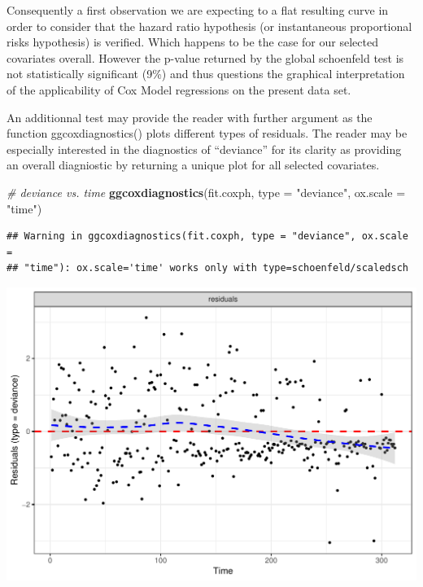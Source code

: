 \documentclass[]{article}
\newenvironment{Shaded}{\begin{snugshade}}{\end{snugshade}}
\newcommand{\KeywordTok}[1]{\textcolor[rgb]{0.13,0.29,0.53}{\textbf{#1}}}
\newcommand{\DataTypeTok}[1]{\textcolor[rgb]{0.13,0.29,0.53}{#1}}
\newcommand{\StringTok}[1]{\textcolor[rgb]{0.31,0.60,0.02}{#1}}
\newcommand{\CommentTok}[1]{\textcolor[rgb]{0.56,0.35,0.01}{\textit{#1}}}
\newcommand{\NormalTok}[1]{#1}
\begin{document}
Consequently a first observation we are expecting to a flat resulting
curve in order to consider that the hazard ratio hypothesis (or
instantaneous proportional risks hypothesis) is verified. Which happens
to be the case for our selected covariates overall. However the p-value
returned by the global schoenfeld test is not statistically significant
(9\%) and thus questions the graphical interpretation of the
applicability of Cox Model regressions on the present data set.

An additionnal test may provide the reader with further argument as the
function ggcoxdiagnostics() plots different types of residuals. The
reader may be especially interested in the diagnostics of ``deviance''
for its clarity as providing an overall diagniostic by returning a
unique plot for all selected covariates.

\begin{Shaded}
\begin{Highlighting}[]
\CommentTok{# deviance vs. time}
\KeywordTok{ggcoxdiagnostics}\NormalTok{(fit.coxph, }\DataTypeTok{type =} \StringTok{"deviance"}\NormalTok{, }\DataTypeTok{ox.scale =} \StringTok{"time"}\NormalTok{)}
\end{Highlighting}
\end{Shaded}

\begin{verbatim}
## Warning in ggcoxdiagnostics(fit.coxph, type = "deviance", ox.scale =
## "time"): ox.scale='time' works only with type=schoenfeld/scaledsch
\end{verbatim}

\includegraphics{survival_pbc_files/figure-latex/unnamed-chunk-38-1.pdf}
\end{document}
